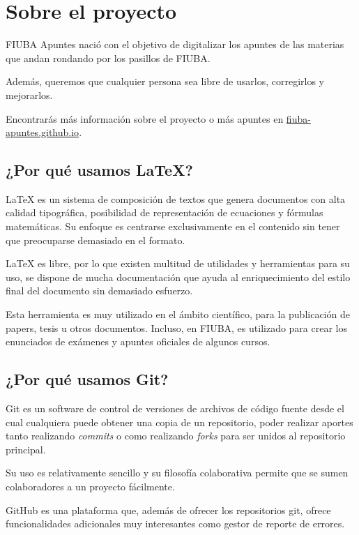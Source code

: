 \documentclass[apunte.tex]{subfiles}
\begin{document}
\newpage
\section{Sobre el proyecto}
FIUBA Apuntes nació con el objetivo de digitalizar los apuntes de las materias que andan rondando por los pasillos de FIUBA.

Además, queremos que cualquier persona sea libre de usarlos, corregirlos y mejorarlos.

Encontrarás más información sobre el proyecto o más apuntes en \href{http://fiuba-apuntes.github.io}{fiuba-apuntes.github.io}.

\subsection{¿Por qué usamos LaTeX?}

LaTeX es un sistema de composición de textos que genera documentos con alta calidad tipográfica, posibilidad de representación de ecuaciones y fórmulas matemáticas. Su enfoque es centrarse exclusivamente en el contenido sin tener que preocuparse demasiado en el formato.

LaTeX es libre, por lo que existen multitud de utilidades y herramientas para su uso, se dispone de mucha documentación que ayuda al enriquecimiento del estilo final del documento sin demasiado esfuerzo.

Esta herramienta es muy utilizado en el ámbito científico, para la publicación de papers, tesis u otros documentos. Incluso, en FIUBA, es utilizado para crear los enunciados de exámenes y apuntes oficiales de algunos cursos.

\subsection{¿Por qué usamos Git?}

Git es un software de control de versiones de archivos de código fuente desde el cual cualquiera puede obtener una copia de un repositorio, poder realizar aportes tanto realizando \textit{commits} o como realizando \textit{forks} para ser unidos al repositorio principal.

Su uso es relativamente sencillo y su filosofía colaborativa permite que se sumen colaboradores a un proyecto fácilmente.

GitHub es una plataforma que, además de ofrecer los repositorios git, ofrece funcionalidades adicionales muy interesantes como gestor de reporte de errores.

\newpage
\end{document}
